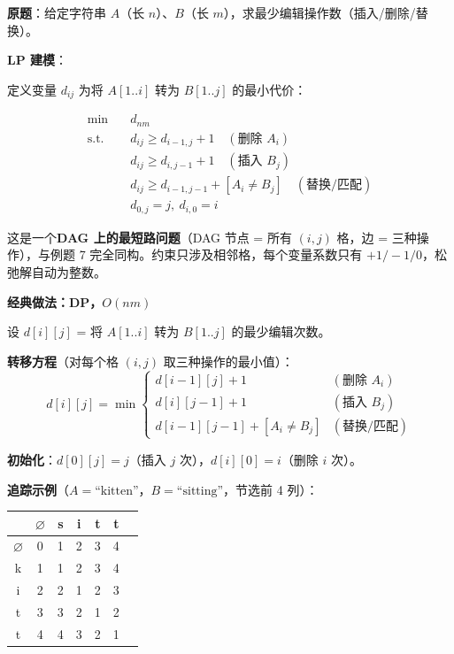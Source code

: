 \documentclass[12pt, a4paper]{ctexart}
\begin{document}
\begin{blackboard}

\textbf{原题}：给定字符串 $A$（长 $n$）、$B$（长 $m$），求最少编辑操作数（插入/删除/替换）。

\textbf{LP 建模}：

定义变量 $d_{ij}$ 为将 $A[1..i]$ 转为 $B[1..j]$ 的最小代价：

\begin{align}
\min \quad & d_{nm} \\
\text{s.t.} \quad & d_{ij} \geq d_{i-1,j} + 1 \quad (\text{删除 }A_i) \\
& d_{ij} \geq d_{i,j-1} + 1 \quad (\text{插入 }B_j) \\
& d_{ij} \geq d_{i-1,j-1} + [A_i \neq B_j] \quad (\text{替换/匹配}) \\
& d_{0,j} = j,\ d_{i,0} = i
\end{align}

这是一个\textbf{DAG 上的最短路问题}（DAG 节点 = 所有 $(i,j)$ 格，边 = 三种操作），与例题 7 完全同构。约束只涉及相邻格，每个变量系数只有 $+1/-1/0$，松弛解自动为整数。

\textbf{经典做法：DP，$O(nm)$}

设 $d[i][j]$ = 将 $A[1..i]$ 转为 $B[1..j]$ 的最少编辑次数。

\textbf{转移方程}（对每个格 $(i,j)$ 取三种操作的最小值）：
$$d[i][j] = \min\!\begin{cases} d[i-1][j] + 1 & (\text{删除 }A_i) \\ d[i][j-1] + 1 & (\text{插入 }B_j) \\ d[i-1][j-1] + [A_i \neq B_j] & (\text{替换/匹配}) \end{cases}$$

\textbf{初始化}：$d[0][j]=j$（插入 $j$ 次），$d[i][0]=i$（删除 $i$ 次）。

\textbf{追踪示例}（$A=\text{``kitten''}$，$B=\text{``sitting''}$，节选前 4 列）：

\medskip
\begin{center}\small
\begin{tabular}{c|cccccc}
 & $\varnothing$ & s & i & t & t \\
\hline
$\varnothing$ & 0 & 1 & 2 & 3 & 4 \\
k & 1 & 1 & 2 & 3 & 4 \\
i & 2 & 2 & 1 & 2 & 3 \\
t & 3 & 3 & 2 & 1 & 2 \\
t & 4 & 4 & 3 & 2 & 1 \\
\end{tabular}
\end{center}


\end{blackboard}
\end{document}
